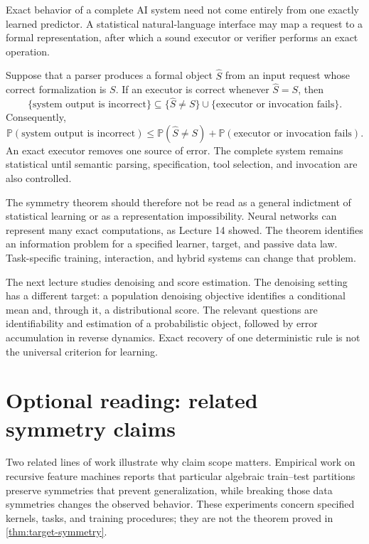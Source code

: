 \documentclass[11pt,twoside]{article}
\renewcommand{\P}{\mathbb P}
\theoremstyle{definition}
\theoremstyle{remark}
\begin{document}
Exact behavior of a complete AI system need not come entirely from one
exactly learned predictor. A statistical natural-language interface may map a
request to a formal representation, after which a sound executor or verifier
performs an exact operation.

Suppose that a parser produces a formal object \(\widehat S\) from an input
request whose correct formalization is \(S\). If an executor is correct
whenever \(\widehat S=S\), then
\begin{equation}
 \{\text{system output is incorrect}\}
 \subseteq
 \{\widehat S\ne S\}\cup
 \{\text{executor or invocation fails}\}.
 \label{eq:system-error-events}
\end{equation}
Consequently,
\begin{equation}
 \P(\text{system output is incorrect})
 \le
 \P(\widehat S\ne S)
 +\P(\text{executor or invocation fails}).
 \label{eq:system-error-bound}
\end{equation}
An exact executor removes one source of error. The complete system remains
statistical until semantic parsing, specification, tool selection, and
invocation are also controlled.

The symmetry theorem should therefore not be read as a general indictment of
statistical learning or as a representation impossibility. Neural networks
can represent many exact computations, as Lecture 14 showed. The theorem
identifies an information problem for a specified learner, target, and passive
data law. Task-specific training, interaction, and hybrid systems can change
that problem.

The next lecture studies denoising and score estimation. The denoising setting has a
different target: a population denoising objective identifies a conditional
mean and, through it, a distributional score. The relevant questions are
identifiability and estimation of a probabilistic object, followed by error
accumulation in reverse dynamics. Exact recovery of one deterministic rule is
not the universal criterion for learning.

\section{Optional reading: related symmetry claims}
\label{sec:optional}

Two related lines of work illustrate why claim scope matters. Empirical work
on recursive feature machines reports that particular algebraic train--test
partitions preserve symmetries that prevent generalization, while breaking
those data symmetries changes the observed behavior. These experiments concern
specified kernels, tasks, and training procedures; they are not the theorem
proved in \cref{thm:target-symmetry}.
\end{document}
